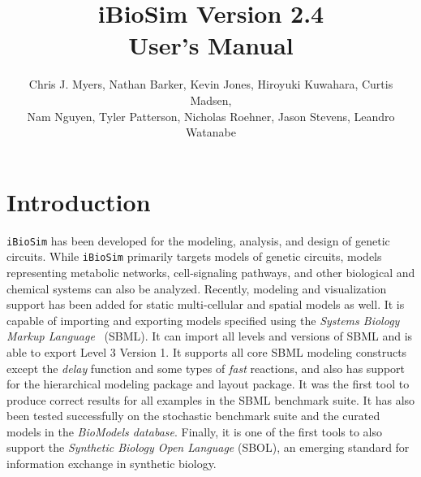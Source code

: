 \documentclass[titlepage,11pt]{article}
\title{iBioSim Version 2.4 \\ User's Manual}
\author{Chris J. Myers, Nathan Barker, Kevin Jones, Hiroyuki Kuwahara, Curtis
  Madsen, \\ Nam Nguyen, Tyler Patterson, Nicholas Roehner, Jason Stevens, Leandro Watanabe}
\begin{document}
\maketitle

  
\tableofcontents

\clearpage

\section{Introduction}

\noindent
{\tt iBioSim} has been developed for the modeling, analysis, and design of genetic circuits.  While {\tt iBioSim} primarily targets models of genetic circuits, models representing metabolic networks, cell-signaling pathways, and other biological and chemical systems can also be analyzed.  Recently, modeling and visualization support has been added for static multi-cellular and spatial models as well.
It is capable of importing and exporting models specified using the %
\emph{Systems Biology Markup Language}
~(SBML).  It can import all levels and versions of SBML and is able to export Level 3 Version 1.  It supports all core SBML modeling constructs except the \emph{delay} function and some types of \emph{fast} reactions, and also has support for the hierarchical modeling package and layout package.  It was the first tool to produce correct results for all examples in the SBML benchmark suite.  It has also been tested successfully on the stochastic benchmark suite and the curated models in the 
\emph{BioModels database}.
Finally, it is one of the first tools to also support the 
\emph{Synthetic Biology Open Language}
(SBOL), an emerging standard for information exchange in synthetic biology.
\end{document}
